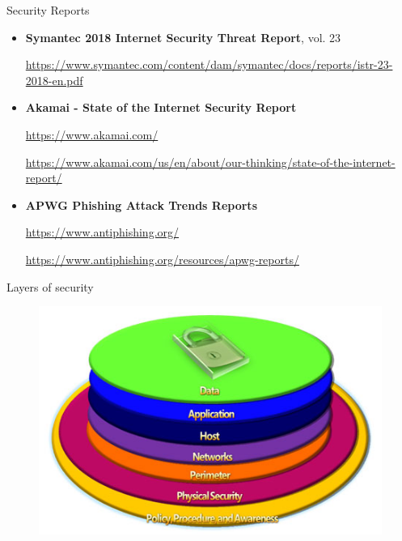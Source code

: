 \documentclass[pdf]{beamer}
\begin{document}
\begin{frame}{Security Reports}
\begin{itemize}
\item
\textbf{Symantec 2018 Internet Security Threat Report}, vol. 23

\url{https://www.symantec.com/content/dam/symantec/docs/reports/istr-23-2018-en.pdf}



\item
\textbf{Akamai - State of the Internet Security Report}

\url{https://www.akamai.com/}

\url{https://www.akamai.com/us/en/about/our-thinking/state-of-the-internet-report/}

\item
\textbf{APWG Phishing Attack Trends Reports}

\url{https://www.antiphishing.org/}

\url{https://www.antiphishing.org/resources/apwg-reports/}

\end{itemize}
\end{frame}



\begin{frame}{Layers of security}
\begin{figure}[t]
\centering
\includegraphics[scale=0.6]{Images/layers-of-security}
\end{figure}
\end{frame}
\end{document}
